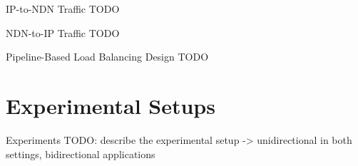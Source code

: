 \documentclass[handout]{beamer}
\begin{document}
\begin{frame}{IP-to-NDN Traffic}
	TODO
\end{frame}

\begin{frame}{NDN-to-IP Traffic}
	TODO
\end{frame}

\begin{frame}{Pipeline-Based Load Balancing Design}
	TODO
\end{frame}

\section{Experimental Setups}
\begin{frame}{Experiments}
	TODO: describe the experimental setup -> unidirectional in both settings, bidirectional applications
\end{frame}


\end{document}
